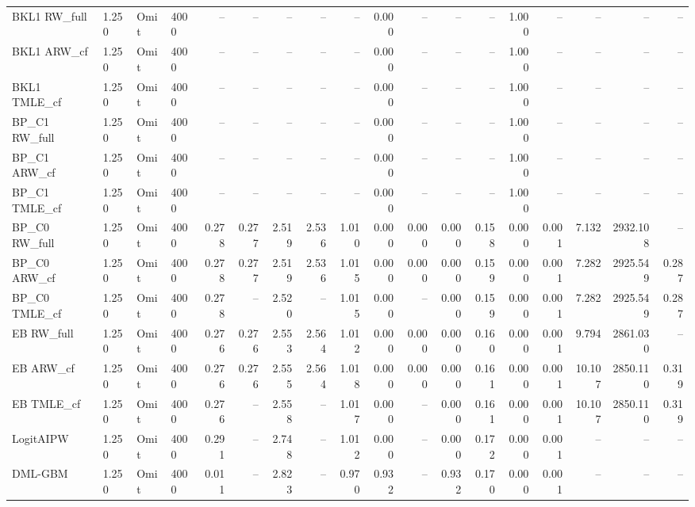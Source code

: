 \begin{tabular}{llllrrrrrrrrrrrrrr}
BKL1 RW\_full & 1.250 & Omit & 4000 & -- & -- & -- & -- & -- & 0.000 & -- & -- & -- & 1.000 & -- & -- & -- & -- \\
BKL1 ARW\_cf & 1.250 & Omit & 4000 & -- & -- & -- & -- & -- & 0.000 & -- & -- & -- & 1.000 & -- & -- & -- & -- \\
BKL1 TMLE\_cf & 1.250 & Omit & 4000 & -- & -- & -- & -- & -- & 0.000 & -- & -- & -- & 1.000 & -- & -- & -- & -- \\
BP\_C1 RW\_full & 1.250 & Omit & 4000 & -- & -- & -- & -- & -- & 0.000 & -- & -- & -- & 1.000 & -- & -- & -- & -- \\
BP\_C1 ARW\_cf & 1.250 & Omit & 4000 & -- & -- & -- & -- & -- & 0.000 & -- & -- & -- & 1.000 & -- & -- & -- & -- \\
BP\_C1 TMLE\_cf & 1.250 & Omit & 4000 & -- & -- & -- & -- & -- & 0.000 & -- & -- & -- & 1.000 & -- & -- & -- & -- \\
BP\_C0 RW\_full & 1.250 & Omit & 4000 & 0.278 & 0.277 & 2.519 & 2.536 & 1.010 & 0.000 & 0.000 & 0.000 & 0.158 & 0.000 & 0.001 & 7.132 & 2932.108 & -- \\
BP\_C0 ARW\_cf & 1.250 & Omit & 4000 & 0.278 & 0.277 & 2.519 & 2.536 & 1.015 & 0.000 & 0.000 & 0.000 & 0.159 & 0.000 & 0.001 & 7.282 & 2925.549 & 0.287 \\
BP\_C0 TMLE\_cf & 1.250 & Omit & 4000 & 0.278 & -- & 2.520 & -- & 1.015 & 0.000 & -- & 0.000 & 0.159 & 0.000 & 0.001 & 7.282 & 2925.549 & 0.287 \\
EB RW\_full & 1.250 & Omit & 4000 & 0.276 & 0.276 & 2.553 & 2.564 & 1.012 & 0.000 & 0.000 & 0.000 & 0.160 & 0.000 & 0.001 & 9.794 & 2861.030 & -- \\
EB ARW\_cf & 1.250 & Omit & 4000 & 0.276 & 0.276 & 2.555 & 2.564 & 1.018 & 0.000 & 0.000 & 0.000 & 0.161 & 0.000 & 0.001 & 10.107 & 2850.110 & 0.319 \\
EB TMLE\_cf & 1.250 & Omit & 4000 & 0.276 & -- & 2.558 & -- & 1.017 & 0.000 & -- & 0.000 & 0.161 & 0.000 & 0.001 & 10.107 & 2850.110 & 0.319 \\
LogitAIPW & 1.250 & Omit & 4000 & 0.291 & -- & 2.748 & -- & 1.012 & 0.000 & -- & 0.000 & 0.172 & 0.000 & 0.001 & -- & -- & -- \\
DML-GBM & 1.250 & Omit & 4000 & 0.011 & -- & 2.823 & -- & 0.970 & 0.932 & -- & 0.932 & 0.170 & 0.000 & 0.001 & -- & -- & -- \\
\hline
\end{tabular}

